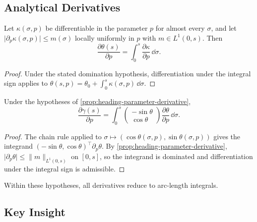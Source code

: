 \subsection{Analytical Derivatives}

\begin{proposition}
\label{prop:heading-parameter-derivative}
Let \(\kappa(\sigma,p)\) be differentiable in the parameter \(p\) for
almost every \(\sigma\), and let
\(\lvert\partial_p\kappa(\sigma,p)\rvert\le m(\sigma)\) locally uniformly
in \(p\) with \(m\in L^1(0,s)\). Then
\[
\frac{\partial \theta(s)}{\partial p}
=
\int_0^s
\frac{\partial \kappa}{\partial p}\,\dd\sigma.
\]
\end{proposition}

\begin{proof}
Under the stated domination hypothesis, differentiation under the integral
sign applies to
\(\theta(s,p)=\theta_0+\int_0^s\kappa(\sigma,p)\,\dd\sigma\).
\end{proof}

\begin{proposition}
\label{prop:position-parameter-derivative}
Under the hypotheses of \cref{prop:heading-parameter-derivative},
\[
\frac{\partial \gamma(s)}{\partial p}
=
\int_0^s
\begin{pmatrix}
-\sin\theta \\
\cos\theta
\end{pmatrix}
\frac{\partial \theta}{\partial p}\,\dd\sigma.
\]
\end{proposition}

\begin{proof}
The chain rule applied to
\(\sigma\mapsto(\cos\theta(\sigma,p),\sin\theta(\sigma,p))\) gives the
integrand \((-\sin\theta,\cos\theta)^{\!\top}\partial_p\theta\). By
\cref{prop:heading-parameter-derivative},
\(\lvert\partial_p\theta\rvert\le\lVert m\rVert_{L^1(0,s)}\) on \([0,s]\),
so the integrand is dominated and differentiation under the integral sign
is admissible.
\end{proof}

Within these hypotheses, all derivatives reduce to arc-length integrals.

\subsection{Key Insight}

